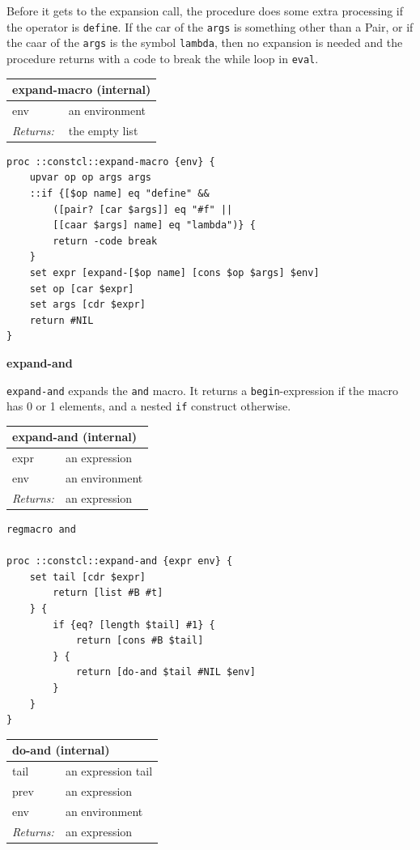 \documentclass[twoside,9pt]{report}
\begin{document}
Before it gets to the expansion call, the procedure does some extra processing if the operator is \texttt{define}. If the car of the \texttt{args} is something other than a Pair, or if the caar of the \texttt{args} is the symbol \texttt{lambda}, then no expansion is needed and the procedure returns with a code to break the while loop in \texttt{eval}.

\begin{tabular}{ |l l| }
\hline
\multicolumn{2}{|l|}{expand-macro (internal)} \\
\hline
env & an environment \\
\textit{Returns:} & the empty list \\
\hline
\end{tabular}

\noindent\makebox[\linewidth]{\rule{\linewidth}{0.4pt}}
\begin{lstlisting}
proc ::constcl::expand-macro {env} {
    upvar op op args args
    ::if {[$op name] eq "define" &&
        ([pair? [car $args]] eq "#f" ||
        [[caar $args] name] eq "lambda")} {
        return -code break
    }
    set expr [expand-[$op name] [cons $op $args] $env]
    set op [car $expr]
    set args [cdr $expr]
    return #NIL
}
\end{lstlisting}
\noindent\makebox[\linewidth]{\rule{\linewidth}{0.4pt}}

\textbf{expand-and}


\texttt{expand-and} expands the \texttt{and} macro. It returns a \texttt{begin}-expression if the
macro has 0 or 1 elements, and a nested \texttt{if} construct otherwise.


\begin{tabular}{ |l l| }
\hline
\multicolumn{2}{|l|}{expand-and (internal)} \\
\hline
expr & an expression \\
env & an environment \\
\textit{Returns:} & an expression \\
\hline
\end{tabular}

\noindent\makebox[\linewidth]{\rule{\linewidth}{0.4pt}}
\begin{lstlisting}
regmacro and
 
proc ::constcl::expand-and {expr env} {
    set tail [cdr $expr]
        return [list #B #t]
    } {
        if {eq? [length $tail] #1} {
            return [cons #B $tail]
        } {
            return [do-and $tail #NIL $env]
        }
    }
}
\end{lstlisting}
\noindent\makebox[\linewidth]{\rule{\linewidth}{0.4pt}}
\begin{tabular}{ |l l| }
\hline
\multicolumn{2}{|l|}{do-and (internal)} \\
\hline
tail & an expression tail \\
prev & an expression \\
env & an environment \\
\textit{Returns:} & an expression \\
\hline
\end{tabular}
\end{document}
